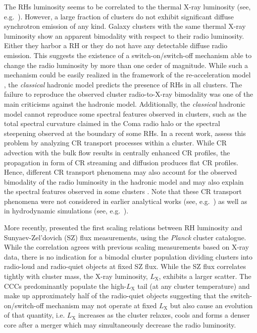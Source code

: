 \documentclass[traditabstract]{aa}
\newcommand{\rmn}{\mathrm}
\begin{document}
The RHs luminosity seems to be correlated to the thermal X-ray luminosity (see,
e.g.~\citealp{2009A&A...507..661B,2011A&A...527A..99E}).  However, a large
fraction of clusters do not exhibit significant diffuse synchrotron emission of
any kind. Galaxy clusters with the same thermal X-ray luminosity show an
apparent bimodality with respect to their radio luminosity. Either they harbor a
RH or they do not have any detectable diffuse radio emission.  This suggests the
existence of a switch-on/switch-off mechanism able to change the radio
luminosity by more than one order of magnitude.  While such a mechanism could be
easily realized in the framework of the re-acceleration model
\citep{2009A&A...507..661B}, the \emph{classical} hadronic model predicts the
presence of RHs in all clusters. The failure to reproduce the observed cluster
radio-to-X-ray bimodality was one of the main criticisms against the hadronic
model. Additionally, the \emph{classical} hadronic model cannot reproduce some
spectral features observed in clusters, such as the total spectral curvature
claimed in the Coma radio halo or the spectral steepening observed at the
boundary of some RHs. In a recent work, \cite{2011A&A...527A..99E} assess this
problem by analyzing CR transport processes within a cluster. While CR advection
with the bulk flow results in centrally enhanced CR profiles, the propagation in
form of CR streaming and diffusion produces flat CR profiles. Hence, different
CR transport phenomena may also account for the observed bimodality of the radio
luminosity in the hadronic model and may also explain the spectral features
observed in some clusters \citep{2011A&A...527A..99E}. Note that these CR
transport phenomena were not considered in earlier analytical works (see,
e.g.~\citealp{2004A&A...413...17P}) as well as in hydrodynamic simulations (see,
e.g.~\citealp{2001ApJ...562..233M, 2008MNRAS.385.1211P, 2010MNRAS.409..449P}).

More recently, \cite{2012MNRAS.421L.112B} presented the first scaling relations
between RH luminosity and Sunyaev-Zel'dovich (SZ) flux measurements, using the
\emph{Planck} cluster catalogue. While the correlation agrees with previous
scaling measurements based on X-ray data, there is no indication for a bimodal
cluster population dividing clusters into radio-loud and radio-quiet objects at
fixed SZ flux. While the SZ flux correlates tightly with cluster mass, the X-ray
luminosity, $L_\rmn{X}$, exhibits a larger scatter. The CCCs predominantly
populate the high-$L_\rmn{X}$ tail (at any cluster temperature) and make up
approximately half of the radio-quiet objects \citep{2011A&A...527A..99E}
suggesting that the switch-on/switch-off mechanism may not operate at fixed
$L_\rmn{X}$ but also cause an evolution of that quantity, i.e. $L_\rmn{X}$
increases as the cluster relaxes, cools and forms a denser core after a merger
which may simultaneously decrease the radio luminosity.
 
\end{document}

